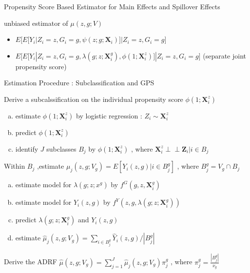 \documentclass[notes,11pt, aspectratio=169]{beamer}
\begin{document}
\begin{frame}{Propensity Score Based Estimator for Main Effects and Spillover Effects}
\begin{block}{unbiased estimator of $\mu(z,g;V)$}
\begin{itemize}
    \item $E \Big[ E[Y_i|Z_i=z,G_i=g,\psi(z;g;\mathbf{X}_i)]|Z_i=z,G_i=g \Big]$
    \item $E \Big[ E[Y_i|Z_i=z,G_i=g,\lambda(g;z;\mathbf{X}_{i}^g), \phi(1;\mathbf{X}_{i}^z)]|Z_i=z,G_i=g \Big]$ (separate joint propensity score)
\end{itemize}   
\end{block}
\end{frame}




\begin{frame}{Estimation Procedure : Subclassification and GPS}
\begin{wideitemize}
    \item Derive a subcalssification on the individual propensity score $\phi(1;\mathbf{X}_{i}^{z})$
    \begin{enumerate}[(a)]
      \item estimate  $\phi(1;\mathbf{X}_{i}^{z})$ by logistic regression : $Z_i \sim \mathbf{X}_i^z$
      \item predict $\phi(1;\mathbf{X}_{i}^{z})$
      \item identify $J$ subclasses $B_j$ by $\phi(1;\mathbf{X}_{i}^{z})$ , where $\mathbf{X}_i^z \perp\!\!\!\perp \mathbf{Z}_i| i \in B_j$
    \end{enumerate}
    \item Within $B_j$ ,estimate $\mu_j(z,g;V_g)=E[Y_i(z,g)|i \in B_j^g]$ , where $B_j^g=V_g \cap B_j$
    \begin{enumerate}[(a)]
       \item estimate model for $\lambda(g;z;x^g)$ by $f^G(g,z,\mathbf{X}_i^g)$
       \item estimate model for $Y_i(z,g)$ by $f^{Y}(z,g,\lambda(g;z;\mathbf{X}_i^g))$
       \item predict $\lambda(g;z;\mathbf{X}_i^g)$ and $Y_i(z,g)$
       \item estimate $\hat{\mu}_j(z,g;V_g)=\sum_{i \in B_j^g} \hat{Y}_i(z,g) / {|B_j^g|}$
    \end{enumerate}
%
    \item Derive the ADRF
$\hat{\mu}(z,g;V_g)=\sum_{j=1}^{J} \hat{\mu}_j(z,g;V_g) \pi_j^g$ , where $\pi_{j}^{g}=\frac{|B_j^g|}{\nu_g}$
%
\end{wideitemize}
\end{frame}
\end{document}
